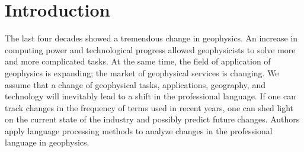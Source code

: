 \documentclass[geosciences,article,submit,moreauthors,pdftex]{Definitions/mdpi}
\begin{document}


\section{Introduction}
The last four decades showed a tremendous change in geophysics. An increase in computing power and technological progress allowed geophysicists to solve more and more complicated tasks. At the same time, the field of application of geophysics is expanding; the market of geophysical services is changing. We assume that a change of geophysical tasks, applications, geography, and technology will inevitably lead to a shift in the professional language. If one can track changes in the frequency of terms used in recent years, one can shed light on the current state of the industry and possibly predict future changes. Authors apply language processing methods to analyze changes in the professional language in geophysics.
\end{document}
